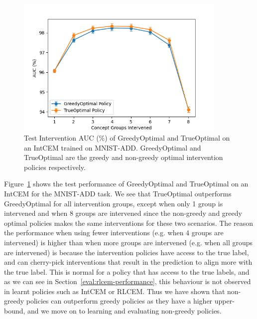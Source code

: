 \begin{figure}[!h]
    \centering
    \includegraphics[width=0.9\textwidth]{figs/evaluation/greedy_vs_true_optimal.png}
    \caption{
        Test Intervention AUC (\%) of GreedyOptimal and TrueOptimal
        on an IntCEM trained on MNIST-ADD. GreedyOptimal and TrueOptimal are the greedy and non-greedy optimal intervention
        policies respectively.
    }
    \label{fig:greedy-vs-optimal}
\end{figure}

Figure~\ref{fig:greedy-vs-optimal} shows the test performance of 
GreedyOptimal and TrueOptimal on an IntCEM for the 
MNIST-ADD task. We see that TrueOptimal outperforms 
GreedyOptimal for all intervention groups, except
when only 1 group is intervened and when 8 groups are intervened
since the non-greedy and greedy optimal policies 
makes the same interventions for these two scenarios. 
The reason the performance when using
fewer interventions (e.g. when 4 groups are intervened) is higher than
when more groups are intervened (e.g. when all groups are intervened)
is because the intervention policies have access to the true 
label, and can cherry-pick interventions that result in 
the prediction to align more with the true label. This is
normal for a policy that has access to the 
true labels, and as we can see in 
Section~\ref{eval:rlcem-performance}, this behaviour is not observed 
in learnt policies such as IntCEM or RLCEM.
Thus we have shown that non-greedy policies 
can outperform greedy policies as they have a higher upper-bound,
and we move on to learning and evaluating non-greedy policies.


        
